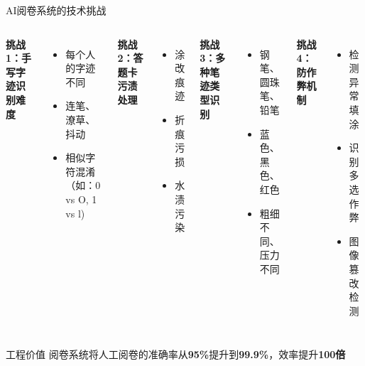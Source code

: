 \begin{frame}[fragile]{AI阅卷系统的技术挑战}
    \begin{columns}
        \textbf{挑战1：手写字迹识别难度}
        \begin{itemize}
            \item 每个人的字迹不同
            \item 连笔、潦草、抖动
            \item 相似字符混淆（如：0 vs O, 1 vs l)
        \end{itemize}

        \vspace{0.3cm}
        \textbf{挑战2：答题卡污渍处理}
        \begin{itemize}
            \item 涂改痕迹
            \item 折痕污损
            \item 水渍污染
        \end{itemize}

        \textbf{挑战3：多种笔迹类型识别}
        \begin{itemize}
            \item 钢笔、圆珠笔、铅笔
            \item 蓝色、黑色、红色
            \item 粗细不同、压力不同
        \end{itemize}

        \vspace{0.3cm}
        \textbf{挑战4：防作弊机制}
        \begin{itemize}
            \item 检测异常填涂
            \item 识别多选作弊
            \item 图像篡改检测
        \end{itemize}
    \end{columns}

    \vspace{0.5cm}
    \begin{block}{工程价值}
        阅卷系统将人工阅卷的准确率从\textbf{95\%}提升到\textbf{99.9\%}，效率提升\textbf{100倍}
    \end{block}
\end{frame}


